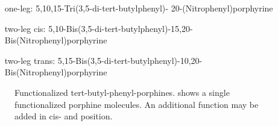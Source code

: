 \begin{itemize}
	\item[one-leg:]  	 5,10,15-Tri(3,5-di-tert-butylphenyl)-   20-(Nitrophenyl)porphyrine
	\item[two-leg cis:] 	5,10-Bis(3,5-di-tert-butylphenyl)-15,20-Bis(Nitrophenyl)porphyrine
	\item[two-leg trans:] 	5,15-Bis(3,5-di-tert-butylphenyl)-10,20-Bis(Nitrophenyl)porphyrine
	
\end{itemize}

\begin{figure}[]\centering
	\caption{Functionalized tert-butyl-phenyl-porphines.  shows a single functionalized porphine molecules. An additional function may be added in  cis-  and  position.}
	\label{fig:TBP}
\end{figure}
